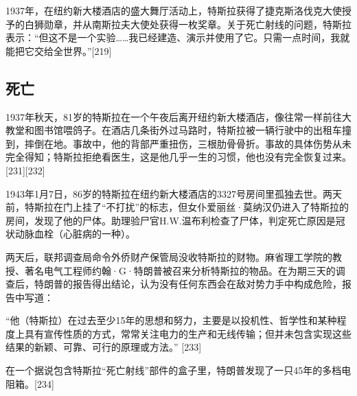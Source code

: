 1937年，在纽约新大楼酒店的盛大舞厅活动上，特斯拉获得了捷克斯洛伐克大使授予的白狮勋章，并从南斯拉夫大使处获得一枚奖章。关于死亡射线的问题，特斯拉表示：“但这不是一个实验……我已经建造、演示并使用了它。只需一点时间，我就能把它交给全世界。”[219]
\subsection{死亡}
1937年秋天，81岁的特斯拉在一个午夜后离开纽约新大楼酒店，像往常一样前往大教堂和图书馆喂鸽子。在酒店几条街外过马路时，特斯拉被一辆行驶中的出租车撞到，摔倒在地。事故中，他的背部严重扭伤，三根肋骨骨折。事故的具体伤势从未完全得知；特斯拉拒绝看医生，这是他几乎一生的习惯，他也没有完全恢复过来。[231][232]

1943年1月7日，86岁的特斯拉在纽约新大楼酒店的3327号房间里孤独去世。两天前，特斯拉在门上挂了“不打扰”的标志，但女仆爱丽丝·莫纳汉仍进入了特斯拉的房间，发现了他的尸体。助理验尸官H.W.温布利检查了尸体，判定死亡原因是冠状动脉血栓（心脏病的一种）。

两天后，联邦调查局命令外侨财产保管局没收特斯拉的财物。麻省理工学院的教授、著名电气工程师约翰·G·特朗普被召来分析特斯拉的物品。在为期三天的调查后，特朗普的报告得出结论，认为没有任何东西会在敌对势力手中构成危险，报告中写道：

“他（特斯拉）在过去至少15年的思想和努力，主要是以投机性、哲学性和某种程度上具有宣传性质的方式，常常关注电力的生产和无线传输；但并未包含实现这些结果的新颖、可靠、可行的原理或方法。” [233]

在一个据说包含特斯拉“死亡射线”部件的盒子里，特朗普发现了一只45年的多档电阻箱。[234]